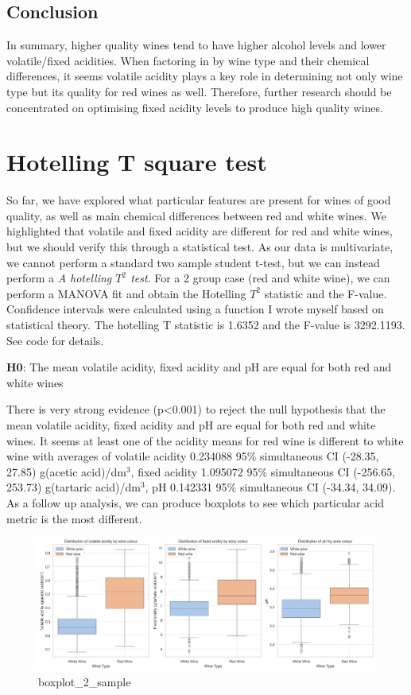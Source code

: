 \documentclass[
]{article}
\begin{document}
\subsection{Conclusion}\label{conclusion}

In summary, higher quality wines tend to have higher alcohol levels and
lower volatile/fixed acidities. When factoring in by wine type and their
chemical differences, it seems volatile acidity plays a key role in
determining not only wine type but its quality for red wines as well.
Therefore, further research should be concentrated on optimising fixed
acidity levels to produce high quality wines.

\section{Hotelling T square test}\label{hotelling-t-square-test}

So far, we have explored what particular features are present for wines
of good quality, as well as main chemical differences between red and
white wines. We highlighted that volatile and fixed acidity are
different for red and white wines, but we should verify this through a
statistical test. As our data is multivariate, we cannot perform a
standard two sample student t-test, but we can instead perform a \emph{A
hotelling \(T^2\) test}. For a 2 group case (red and white wine), we can
perform a MANOVA fit and obtain the Hotelling \(T^2\) statistic and the
F-value. Confidence intervals were calculated using a function I wrote
myself based on statistical theory. The hotelling T statistic is 1.6352
and the F-value is 3292.1193. See code for details.

\textbf{H0}: The mean volatile acidity, fixed acidity and pH are equal
for both red and white wines

There is very strong evidence (p\textless0.001) to reject the null
hypothesis that the mean volatile acidity, fixed acidity and pH are
equal for both red and white wines. It seems at least one of the acidity
means for red wine is different to white wine with averages of volatile
acidity 0.234088 95\% simultaneous CI (-28.35, 27.85) g(acetic
acid)/dm\(^3\), fixed acidity 1.095072 95\% simultaneous CI (-256.65,
253.73) g(tartaric acid)/dm\(^3\), pH 0.142331 95\% simultaneous CI
(-34.34, 34.09). As a follow up analysis, we can produce boxplots to see
which particular acid metric is the most different.

\begin{figure}
\centering
\includegraphics{box_plots_for_hotelling_two_sample.png}
\caption{boxplot\_2\_sample}
\end{figure}
\end{document}
